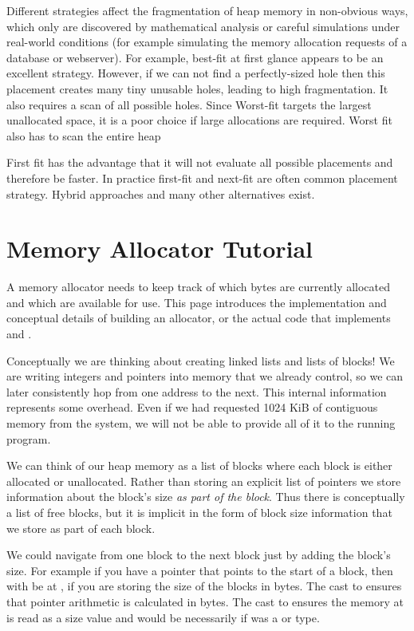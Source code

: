 Different strategies affect the fragmentation of heap memory in non-obvious ways, which only are discovered by mathematical analysis or careful simulations under real-world conditions (for example simulating the memory allocation requests of a database or webserver).
For example, best-fit at first glance appears to be an excellent strategy.
However, if we can not find a perfectly-sized hole then this placement creates many tiny unusable holes, leading to high fragmentation.
It also requires a scan of all possible holes.
Since Worst-fit targets the largest unallocated space, it is a poor choice if large allocations are required.
Worst fit also has to scan the entire heap

First fit has the advantage that it will not evaluate all possible placements and therefore be faster.
In practice first-fit and next-fit are often common placement strategy.
Hybrid approaches and many other alternatives exist.

\section{Memory Allocator Tutorial}

A memory allocator needs to keep track of which bytes are currently allocated and which are available for use.
This page introduces the implementation and conceptual details of building an allocator, or the actual code that implements  and .

Conceptually we are thinking about creating linked lists and lists of blocks!
We are writing integers and pointers into memory that we already control, so we can later consistently hop from one address to the next.
This internal information represents some overhead.
Even if we had requested 1024 KiB of contiguous memory from the system, we will not be able to provide all of it to the running program.

We can think of our heap memory as a list of blocks where each block is either allocated or unallocated.
Rather than storing an explicit list of pointers we store information about the block's size \emph{as part of the block}.
Thus there is conceptually a list of free blocks, but it is implicit in the form of block size information that we store as part of each block.

We could navigate from one block to the next block just by adding the block's size.
For example if you have a pointer  that points to the start of a block, then  with be at , if you are storing the size of the blocks in bytes.
The cast to  ensures that pointer arithmetic is calculated in bytes.
The cast to  ensures the memory at  is read as a size value and would be necessarily if  was a  or  type.

